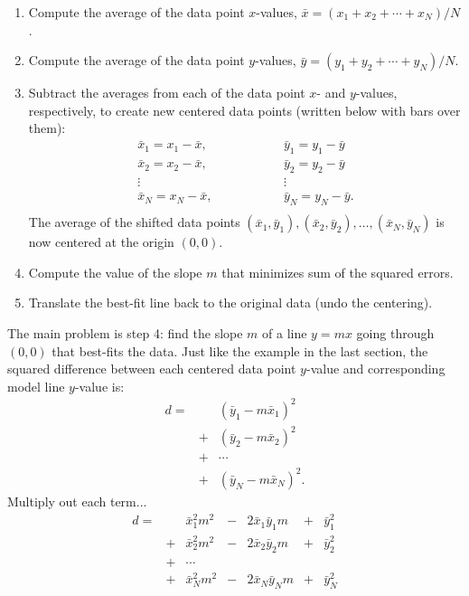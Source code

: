 \documentclass[10pt]{article}
\begin{document}
\begin{enumerate}
\item Compute the average of the data point $x$-values, $\bar{x} = (x_1 + x_2 + \cdots + x_N) / N$.
\item Compute the average of the data point $y$-values, $\bar{y} = (y_1 + y_2 + \cdots + y_N) / N$.
\item Subtract the averages from each of the data point $x$- and $y$-values, respectively, to
create new centered data points (written below with bars over them):
\[
\begin{array}{ccc}
\bar{x}_1 = x_1 - \bar{x}, &\qquad\qquad &\bar{y}_1 = y_1 - \bar{y}\\
\bar{x}_2 = x_2 - \bar{x}, &\qquad\qquad &\bar{y}_2 = y_2 - \bar{y}\\
\vdots & & \vdots\\
\bar{x}_N = x_N - \bar{x}, &\qquad\qquad &\bar{y}_N = y_N - \bar{y}.\\
\end{array}
\]
The average of the shifted data points $(\bar{x}_1, \bar{y}_1), (\bar{x}_2, \bar{y}_2), \ldots, (\bar{x}_N, \bar{y}_N)$
is now centered at the origin $(0,0)$.
\item Compute the value of the slope $m$ that minimizes sum of the squared errors.
\item Translate the best-fit line back to the original data (undo the centering).
\end{enumerate}
The main problem is step 4: find the slope $m$ of a line $y=mx$ going through $(0,0)$ that
best-fits the data. Just like the example in the last section, the squared difference
between each centered data point $y$-value and corresponding model line $y$-value is:
\[
\begin{array}{ccc}
d =&& (\bar{y}_1 - m\bar{x}_1)^2\\
&+& (\bar{y}_2 - m\bar{x}_2)^2\\
&+& \cdots\\
&+&(\bar{y}_N - m\bar{x}_N)^2.
\end{array}
\]
Multiply out each term...
\[
\begin{array}{ccccccc}
d =&& \bar{x}_1^2 m^2 &-& 2\bar{x}_1\bar{y}_1 m &+& \bar{y}_1^2 \\
&+&\bar{x}_2^2 m^2 &-& 2\bar{x}_2\bar{y}_2 m &+& \bar{y}_2^2 \\
&+& \cdots\\
&+&\bar{x}_N^2 m^2 &-& 2\bar{x}_N\bar{y}_N m &+& \bar{y}_N^2 \\
\end{array}
\]
\end{document}
